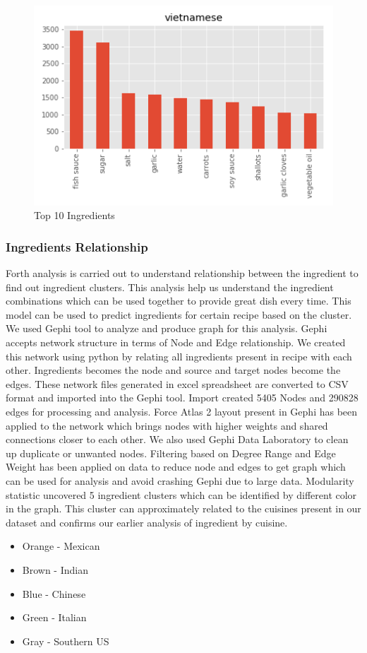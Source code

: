 \documentclass[sigconf]{acmart}
\begin{document}
\begin{figure}[!ht]
  \centering\includegraphics[width=\columnwidth]{images/vietnamese_10_most_used_ingredients.png}
  \caption{Top 10 Ingredients }\label{f:vietnamese_10_most_used_ingredients}
\end{figure}


\subsubsection{Ingredients Relationship}
Forth analysis is carried out to understand relationship between the ingredient to find out ingredient clusters. This analysis help us understand the ingredient combinations which can be used together to provide great dish every time. This model can be used to predict ingredients for certain recipe based on the cluster. We used Gephi tool to analyze and produce graph for this analysis. Gephi accepts network structure in terms of Node and Edge relationship. We created this network using python by relating all ingredients present in recipe with each other. Ingredients becomes the node and source and target nodes become the edges. These network files generated in excel spreadsheet are converted to CSV format and imported into the Gephi tool. Import created 5405 Nodes and 290828 edges for processing and analysis. Force Atlas 2 layout present in Gephi has been applied to the network which brings nodes with higher weights and shared connections closer to each other. We also used Gephi Data Laboratory to clean up duplicate or unwanted nodes. Filtering based on Degree Range and Edge Weight has been applied on data to reduce node and edges to get graph which can be used for analysis and avoid crashing Gephi due to large data. Modularity statistic uncovered 5 ingredient clusters which can be identified by different color in the graph. This cluster can approximately related to the cuisines present in our dataset and confirms our earlier analysis of ingredient by cuisine.
\begin{itemize}
\item Orange - Mexican
\item Brown  - Indian
\item Blue   - Chinese
\item Green  - Italian
\item Gray   - Southern US
\end{itemize}
\end{document}
